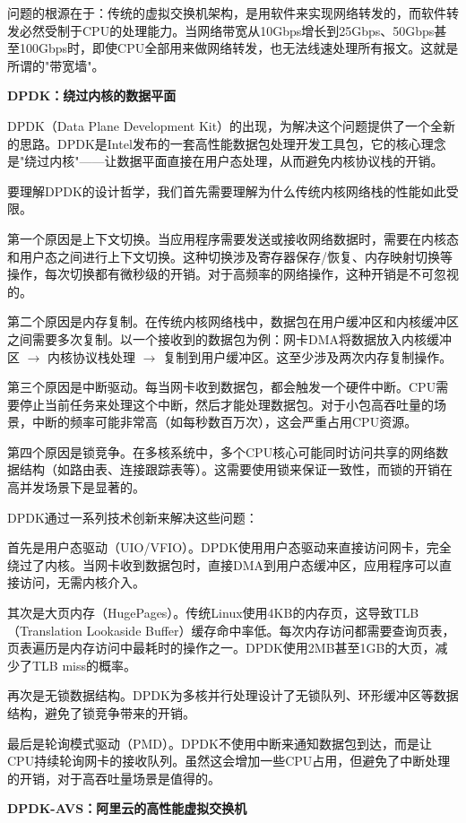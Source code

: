 问题的根源在于：传统的虚拟交换机架构，是用软件来实现网络转发的，而软件转发必然受制于CPU的处理能力。当网络带宽从10Gbps增长到25Gbps、50Gbps甚至100Gbps时，即使CPU全部用来做网络转发，也无法线速处理所有报文。这就是所谓的"带宽墙"。

\textbf{DPDK：绕过内核的数据平面}

DPDK（Data Plane Development Kit）的出现，为解决这个问题提供了一个全新的思路。DPDK是Intel发布的一套高性能数据包处理开发工具包，它的核心理念是"绕过内核"——让数据平面直接在用户态处理，从而避免内核协议栈的开销。

要理解DPDK的设计哲学，我们首先需要理解为什么传统内核网络栈的性能如此受限。

第一个原因是上下文切换。当应用程序需要发送或接收网络数据时，需要在内核态和用户态之间进行上下文切换。这种切换涉及寄存器保存/恢复、内存映射切换等操作，每次切换都有微秒级的开销。对于高频率的网络操作，这种开销是不可忽视的。

第二个原因是内存复制。在传统内核网络栈中，数据包在用户缓冲区和内核缓冲区之间需要多次复制。以一个接收到的数据包为例：网卡DMA将数据放入内核缓冲区 $\rightarrow$ 内核协议栈处理 $\rightarrow$ 复制到用户缓冲区。这至少涉及两次内存复制操作。

第三个原因是中断驱动。每当网卡收到数据包，都会触发一个硬件中断。CPU需要停止当前任务来处理这个中断，然后才能处理数据包。对于小包高吞吐量的场景，中断的频率可能非常高（如每秒数百万次），这会严重占用CPU资源。

第四个原因是锁竞争。在多核系统中，多个CPU核心可能同时访问共享的网络数据结构（如路由表、连接跟踪表等）。这需要使用锁来保证一致性，而锁的开销在高并发场景下是显著的。

DPDK通过一系列技术创新来解决这些问题：

首先是用户态驱动（UIO/VFIO）。DPDK使用用户态驱动来直接访问网卡，完全绕过了内核。当网卡收到数据包时，直接DMA到用户态缓冲区，应用程序可以直接访问，无需内核介入。

其次是大页内存（HugePages）。传统Linux使用4KB的内存页，这导致TLB（Translation Lookaside Buffer）缓存命中率低。每次内存访问都需要查询页表，页表遍历是内存访问中最耗时的操作之一。DPDK使用2MB甚至1GB的大页，减少了TLB miss的概率。

再次是无锁数据结构。DPDK为多核并行处理设计了无锁队列、环形缓冲区等数据结构，避免了锁竞争带来的开销。

最后是轮询模式驱动（PMD）。DPDK不使用中断来通知数据包到达，而是让CPU持续轮询网卡的接收队列。虽然这会增加一些CPU占用，但避免了中断处理的开销，对于高吞吐量场景是值得的。

\textbf{DPDK-AVS：阿里云的高性能虚拟交换机}


